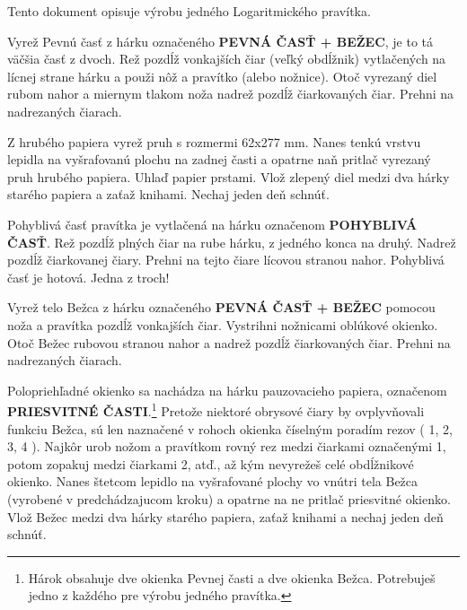 \begin{multicols*}{3}
{  Tento dokument opisuje výrobu jedného Logaritmického pravítka.


Vyrež Pevnú časť z hárku označeného \textbf{PEVNÁ ČASŤ + BEŽEC}, je to tá väčšia časť z dvoch. Rež pozdĺž vonkajších čiar (veľký obdĺžnik) vytlačených na lícnej strane hárku a použi nôž a pravítko (alebo nožnice). Otoč vyrezaný diel rubom nahor a miernym tlakom noža nadrež pozdĺž čiarkovaných čiar. Prehni na nadrezaných čiarach.


Z hrubého papiera vyrež pruh s rozmermi 62x277 mm. Nanes tenkú vrstvu lepidla na vyšrafovanú plochu na zadnej časti a opatrne naň pritlač vyrezaný pruh hrubého papiera. Uhlaď papier prstami. Vlož zlepený diel medzi dva hárky starého papiera a zaťaž knihami. Nechaj jeden deň schnúť.


Pohyblivá časť pravítka je vytlačená na hárku označenom \textbf{POHYBLIVÁ ČASŤ}. Rež pozdĺž plných čiar na rube hárku, z jedného konca na druhý. Nadrež pozdĺž čiarkovanej čiary. Prehni na tejto čiare lícovou stranou nahor. Pohyblivá časť je hotová. Jedna z troch!


Vyrež telo Bežca z hárku označeného \textbf{PEVNÁ ČASŤ + BEŽEC} pomocou noža a pravítka pozdĺž vonkajších čiar. Vystrihni nožnicami oblúkové okienko. Otoč Bežec rubovou stranou nahor a nadrež pozdĺž čiarkovaných čiar. Prehni na nadrezaných čiarach.


Polopriehľadné okienko sa nachádza na hárku pauzovacieho papiera, označenom \textbf{PRIESVITNÉ ČASTI}.\footnote{Hárok obsahuje dve okienka Pevnej časti a dve okienka Bežca. Potrebuješ jedno z každého pre výrobu jedného pravítka.} Pretože niektoré obrysové čiary by ovplyvňovali funkciu Bežca, sú len naznačené v rohoch okienka číselným poradím rezov ( 1, 2, 3, 4 ). Najkôr urob nožom a pravítkom rovný rez medzi čiarkami označenými 1, potom zopakuj medzi čiarkami 2, atď., až kým nevyrežeš celé obdĺžnikové okienko. Nanes štetcom lepidlo na vyšrafované plochy vo vnútri tela Bežca (vyrobené v predchádzajucom kroku) a opatrne na ne pritlač priesvitné okienko. Vlož Bežec medzi dva hárky starého papiera, zaťaž knihami a nechaj jeden deň schnúť.


}
\end{multicols*}
